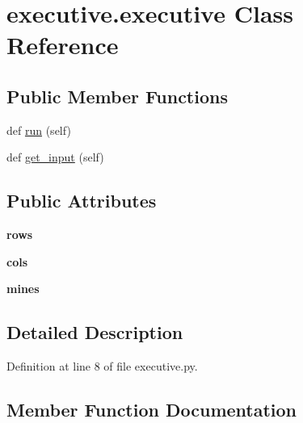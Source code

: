 \hypertarget{classexecutive_1_1executive}{}\section{executive.\+executive Class Reference}
\label{classexecutive_1_1executive}
\subsection*{Public Member Functions}
\begin{DoxyCompactItemize}
\item 
def \hyperlink{classexecutive_1_1executive_abe92cddf119081cac6c747858df061d7}{run} (self)
\item 
def \hyperlink{classexecutive_1_1executive_ab6868bdd71365b918ef8199872be6035}{get\+\_\+input} (self)
\end{DoxyCompactItemize}
\subsection*{Public Attributes}
\begin{DoxyCompactItemize}
\item 
\mbox{\label{classexecutive_1_1executive_a95dd450a8db78fa55cf0920475504983}} 
{\bfseries rows}
\item 
\mbox{\label{classexecutive_1_1executive_a1b724fd808346e0f9258111ac99ff9a7}} 
{\bfseries cols}
\item 
\mbox{\label{classexecutive_1_1executive_a8fd918ea3280772121e6039acdb5ef8e}} 
{\bfseries mines}
\end{DoxyCompactItemize}


\subsection{Detailed Description}


Definition at line 8 of file executive.\+py.



\subsection{Member Function Documentation}
\mbox{\label{classexecutive_1_1executive_ab6868bdd71365b918ef8199872be6035}} 
